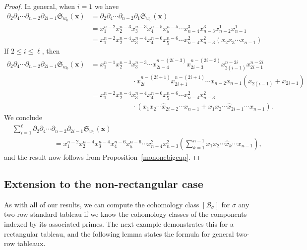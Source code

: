 \documentclass[11pt]{amsart}
\theoremstyle{remark}
\theoremstyle{remark}
\theoremstyle{definition}
\theoremstyle{definition}
\theoremstyle{definition}
\numberwithin{equation}{section}
\newcommand{\gs}{\sigma}
\newcommand{\SF}{\mathcal{B}}
\begin{document}
\begin{proof}
In general, when $i=1$ we have
\begin{align*}\label{eqn:divdiffone}
\partial_2  \partial_4  \cdots \partial_{n-2} \partial_{2 i-1}\mathfrak{S}_{w_0} (\mathbf{x})
&=\partial_2  \partial_4  \cdots  \partial_{n-2} \partial_1 \mathfrak{S}_{w_0}(\mathbf{x}) \\
&=x_1^{n-2} x_2^{n-3} x_3^{n-3}x_4^{n-5}x_5^{n-5} \cdots x_{n-4}^3x_{n-3}^3x_{n-2}^1 x_{n-1}^1 \\
&=x_1^{n-2}x_2^{n-4}x_3^{n-4}x_4^{n-6}x_5^{n-6}\cdots x_{n-4}^2x_{n-3}^2 (x_2x_3\cdots x_{n-1})
\end{align*}
If $2\leq i\leq \ell$, then
\begin{align*}
\partial_2  \partial_4  \cdots \partial_{n-2}  \partial_{2 i-1}\mathfrak{S}_{w_0}(\mathbf{x}) &=  x_1^{n-1} x_2^{n-3} x_3^{n-3} \cdots x_{2 i-4}^{n-(2 i-3)} x_{2 i-3}^{n-(2 i-3)} x_{2( i-1)}^{n-2 i} x_{2 i-1}^{n-2 i} \\ & \qquad\qquad\qquad \cdot x_{2 i}^{n-(2 i+1)} x_{2 i+1}^{n-(2 i+1)} \cdots x_{n-2} x_{n-1}\left(x_{2( i-1)}+x_{2 i-1}\right) \\
&=x_1^{n-2}x_2^{n-4}x_3^{n-4}x_4^{n-6}x_5^{n-6}\cdots x_{n-4}^2x_{n-3}^2 \\
& \qquad\qquad\qquad \cdot (x_1x_2\cdots \hat{x}_{2i-2}\cdots x_{n-1}+ x_1x_2\cdots \hat{x}_{2i-1}\cdots x_{n-1}).
\end{align*}
We conclude 
\begin{align*}
& \sum_{i=1}^{\ell} \partial_2  \partial_4  \cdots \partial_{n-2} \partial_{2 i-1}\mathfrak{S}_{w_0} (\mathbf{x}) \\
& \qquad\qquad\qquad  = x_1^{n-2}x_2^{n-4}x_3^{n-4}x_4^{n-6}x_5^{n-6}\cdots x_{n-4}^2x_{n-3}^2 \left( \sum_{k=1}^{n-1}  x_1x_2\cdots \hat{x}_k \cdots x_{n-1}\right),
\end{align*}
and the result now follows from Proposition~\ref{mononebigcup}.
\end{proof}



\subsection{Extension to the non-rectangular case}

As with all of our results, we can compute the cohomology class $[\SF_\gs]$ for $\gs$ any two-row standard tableau if we know the cohomology classes of the components indexed by its associated primes. The next example demonstrates this for a rectangular tableau, and the following lemma states the formula for general two-row tableaux. 
\end{document}
